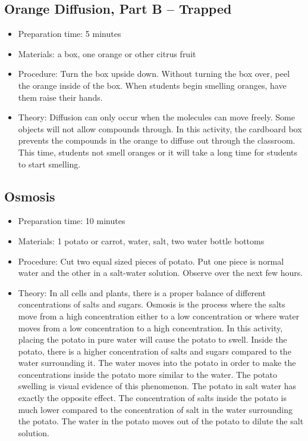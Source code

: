 \subsection{Orange Diffusion, Part B -- Trapped}
\begin{itemize}
\item{Preparation time: 5 minutes}
\item{Materials: a box, one orange or other citrus fruit}
\item{Procedure: Turn the box upside down. Without turning the box over, peel the orange inside of the box. When students begin smelling oranges, have them raise their hands.}
\item{Theory: Diffusion can only occur when the molecules can move freely. Some objects will not allow compounds through. In this activity, the cardboard box prevents the compounds in the orange to diffuse out through the classroom. This time, students not smell oranges or it will take a long time for students to start smelling.}
\end{itemize}

\subsection{Osmosis}
\begin{itemize}
\item{Preparation time: 10 minutes}
\item{Materials: 1 potato or carrot, water, salt, two water bottle bottoms}
\item{Procedure: Cut two equal sized pieces of potato. Put one piece is normal water and the other in a salt-water solution. Observe over the next few hours.}
\item{Theory: In all cells and plants, there is a proper balance of different concentrations of salts and sugars. Osmosis is the process where the salts move from a high concentration either to a low concentration or where water moves from a low concentration to a high concentration. In this activity, placing the potato in pure water will cause the potato to swell. Inside the potato, there is a higher concentration of salts and sugars compared to the water surrounding it. The water moves into the potato in order to make the concentrations inside the potato more similar to the water. The potato swelling is visual evidence of this phenomenon. The potato in salt water has exactly the opposite effect. The concentration of salts inside the potato is much lower compared to the concentration of salt in the water surrounding the potato. The water in the potato moves out of the potato to dilute the salt solution.}
\end{itemize}

